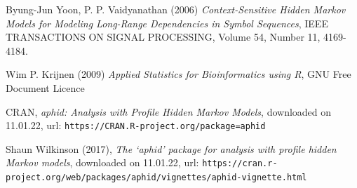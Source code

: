 \documentclass{article}\usepackage[]{graphicx}\usepackage[]{color}
\begin{document}
\begin{thebibliography}{20}
Byung-Jun Yoon, P. P. Vaidyanathan (2006) \emph{Context-Sensitive Hidden Markov Models for Modeling Long-Range Dependencies in Symbol Sequences}, IEEE TRANSACTIONS ON SIGNAL PROCESSING, Volume 54, Number 11, 4169-4184.

Wim P. Krijnen (2009) \emph{Applied Statistics for Bioinformatics using R}, GNU Free Document Licence

CRAN, \emph{aphid: Analysis with Profile Hidden Markov Models}, downloaded on 11.01.22, 
url: \verb$https://CRAN.R-project.org/package=aphid$

Shaun Wilkinson (2017), \emph{The ‘aphid’ package for analysis with profile hidden Markov models}, downloaded on 11.01.22, 
url: \verb$https://cran.r-project.org/web/packages/aphid/vignettes/aphid-vignette.html$

\end{thebibliography}
\end{document}
